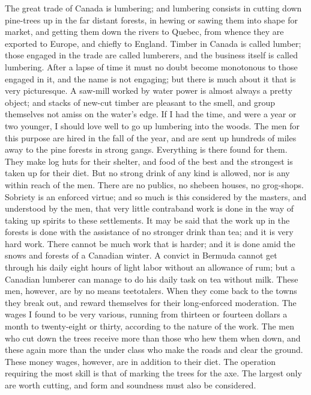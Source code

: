 The great trade of Canada is lumbering; and lumbering consists in
cutting down pine-trees up in the far distant forests, in hewing or
sawing them into shape for market, and getting them down the rivers
to Quebec, from whence they are exported to Europe, and chiefly to
England.  Timber in Canada is called lumber; those engaged in the
trade are called lumberers, and the business itself is called
lumbering.  After a lapse of time it must no doubt become
monotonous to those engaged in it, and the name is not engaging;
but there is much about it that is very picturesque.  A saw-mill
worked by water power is almost always a pretty object; and stacks
of new-cut timber are pleasant to the smell, and group themselves
not amiss on the water's edge.  If I had the time, and were a year
or two younger, I should love well to go up lumbering into the
woods.  The men for this purpose are hired in the fall of the year,
and are sent up hundreds of miles away to the pine forests in
strong gangs.  Everything is there found for them.  They make log
huts for their shelter, and food of the best and the strongest is
taken up for their diet.  But no strong drink of any kind is
allowed, nor is any within reach of the men.  There are no publics,
no shebeen houses, no grog-shops.  Sobriety is an enforced virtue;
and so much is this considered by the masters, and understood by
the men, that very little contraband work is done in the way of
taking up spirits to these settlements.  It may be said that the
work up in the forests is done with the assistance of no stronger
drink than tea; and it is very hard work.  There cannot be much
work that is harder; and it is done amid the snows and forests of a
Canadian winter.  A convict in Bermuda cannot get through his daily
eight hours of light labor without an allowance of rum; but a
Canadian lumberer can manage to do his daily task on tea without
milk.  These men, however, are by no means teetotalers.  When they
come back to the towns they break out, and reward themselves for
their long-enforced moderation.  The wages I found to be very
various, running from thirteen or fourteen dollars a month to
twenty-eight or thirty, according to the nature of the work.  The
men who cut down the trees receive more than those who hew them
when down, and these again more than the under class who make the
roads and clear the ground.  These money wages, however, are in
addition to their diet.  The operation requiring the most skill is
that of marking the trees for the axe.  The largest only are worth
cutting, and form and soundness must also be considered.

